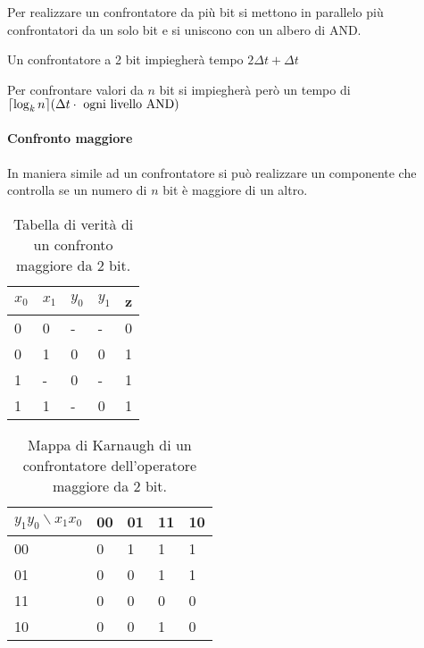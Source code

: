 
Per realizzare un confrontatore da più bit si mettono in parallelo più confrontatori da un solo bit e si uniscono con un albero di AND.


Un confrontatore a 2 bit impiegherà tempo $ 2\Delta t + \Delta t $

Per confrontare valori da $ n $ bit si impiegherà però un tempo di $ \lceil\log_kn\rceil(\Delta t \cdot \text{ ogni livello AND})$

\paragraph{Confronto maggiore}
In maniera simile ad un confrontatore si può realizzare un componente che controlla se un numero di $ n $ bit è maggiore di un altro.

\begin{table}[H]
	\centering
	\caption{Tabella di verità di un confronto maggiore da 2 bit.}
	\label{tab:2bitgreater}
	\begin{tabular}{|ll|ll|l|}
		\hline
		$ x_0 $ & $ x_1 $ & $ y_0 $ & $ y_1 $ & z \\ \hline
		0       & 0       & -       & -       & 0 \\
		0       & 1       & 0       & 0       & 1 \\
		1       & -       & 0       & -       & 1 \\
		1       & 1       & -       & 0       & 1 \\ \hline
	\end{tabular}
\end{table}

\begin{table}[H]
	\centering
	\caption{Mappa di Karnaugh di un confrontatore dell'operatore maggiore da 2 bit.}
	\label{tab:2bitgreater}
	\begin{tabular}{|l|llll|}
		\hline
		$ y_1y_0 \backslash x_1x_0 $ & 00 & 01 & 11                        & 10                        \\ \hline
		00                         & 0  & 1  & \cellcolor[HTML]{FFCCC9}1 & \cellcolor[HTML]{FFCCC9}1 \\
		01                         & 0  & 0  & \cellcolor[HTML]{FFCCC9}1 & \cellcolor[HTML]{FFCCC9}1 \\
		11                         & 0  & 0  & 0                         & 0                         \\
		10                         & 0  & 0  & 1                         & 0                         \\ \hline
	\end{tabular}
\end{table}

